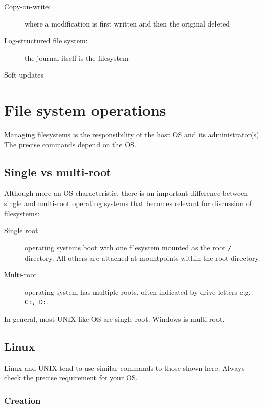 \begin{description}
\item[Copy-on-write:]
where a modification is first written and then the original deleted
\item[Log-structured file system:]
the journal itself is the filesystem
\item[Soft updates]
\end{description}

\section{File system operations}
\label{sec:file-system-operations}

Managing filesystems is the responsibility of the host OS and its administrator(s). The precise commands depend on the OS.

\subsection{Single vs multi-root}
\label{sec:single-vs-multi-root}

Although more an OS-characteristic, there is an important difference
between single and multi-root operating systems that becomes relevant
for discussion of filesystems:

\begin{description}
\item[Single root]
  operating systems boot with one filesystem mounted as the root
\texttt{/} directory. All others are attached at mountpoints within the
root directory.
\item[Multi-root]
operating system has multiple roots, often indicated by drive-letters
e.g. \texttt{C:,\ D:}.
\end{description}

In general, most UNIX-like OS are single root. Windows is multi-root.

\subsection{Linux}
\label{sec:linux}

Linux and UNIX tend to use similar commands to those shown here. Always
check the precise requirement for your OS.

\subsubsection{Creation}
\label{sec:creation}

